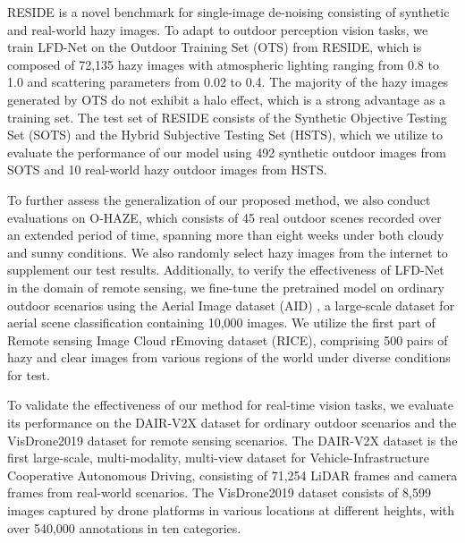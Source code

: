\documentclass[lettersize,journal]{IEEEtran}
\begin{document}
RESIDE is a novel benchmark for single-image de-noising consisting of synthetic and real-world hazy images. To adapt to outdoor perception vision tasks, we train LFD-Net on the Outdoor Training Set (OTS) from RESIDE, which is composed of 72,135 hazy images with atmospheric lighting ranging from 0.8 to 1.0 and scattering parameters from 0.02 to 0.4. The majority of the hazy images generated by OTS do not exhibit a halo effect, which is a strong advantage as a training set. The test set of RESIDE consists of the Synthetic Objective Testing Set (SOTS) and the Hybrid Subjective Testing Set (HSTS), which we utilize to evaluate the performance of our model using 492 synthetic outdoor images from SOTS and 10 real-world hazy outdoor images from HSTS.

To further assess the generalization of our proposed method, we also conduct evaluations on O-HAZE, which consists of 45 real outdoor scenes recorded over an extended period of time, spanning more than eight weeks under both cloudy and sunny conditions. We also randomly select hazy images from the internet to supplement our test results. Additionally, to verify the effectiveness of LFD-Net in the domain of remote sensing, we fine-tune the pretrained model on ordinary outdoor scenarios using the Aerial Image dataset (AID) \cite{xia2017aid}, a large-scale dataset for aerial scene classification containing 10,000 images. We utilize the first part of Remote sensing Image Cloud rEmoving dataset (RICE)\cite{lin2019rice}, comprising 500 pairs of hazy and clear images from various regions of the world under diverse conditions for test.

To validate the effectiveness of our method for real-time vision tasks, we evaluate its performance on the DAIR-V2X dataset \cite{yu2022dair} for ordinary outdoor scenarios and the VisDrone2019 dataset \cite{du2019visdrone} for remote sensing scenarios. The DAIR-V2X dataset is the first large-scale, multi-modality, multi-view dataset for Vehicle-Infrastructure Cooperative Autonomous Driving, consisting of 71,254 LiDAR frames and camera frames from real-world scenarios. The VisDrone2019 dataset consists of 8,599 images captured by drone platforms in various locations at different heights, with over 540,000 annotations in ten categories.
\end{document}
